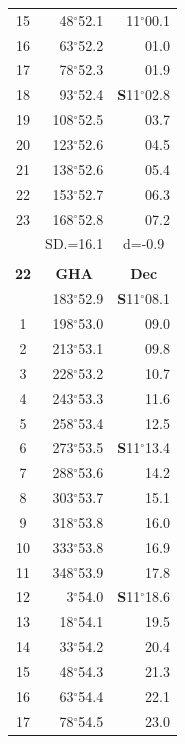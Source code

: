 \documentclass[10pt, a4paper]{report}
\begin{document}
\begin{scriptsize}
\begin{tabular*}{0.2\textwidth}[t]{@{\extracolsep{\fill}}|c|rr|}
15 & 48$^\circ$52.1 & 11$^\circ$00.1\\
16 & 63$^\circ$52.2 & 01.0\\
17 & 78$^\circ$52.3 & 01.9\\[2Pt]
18 & 93$^\circ$52.4 & \textbf{S}11$^\circ$02.8\\
19 & 108$^\circ$52.5 & 03.7\\
20 & 123$^\circ$52.6 & 04.5\\
21 & 138$^\circ$52.6 & \raisebox{0.24ex}{\boldmath$\cdot$~\boldmath$\cdot$~~}05.4\\
22 & 153$^\circ$52.7 & 06.3\\
23 & 168$^\circ$52.8 & 07.2\\
\hline
\rule{0pt}{2.4ex} & \multicolumn{1}{c}{SD.=16.1} & \multicolumn{1}{c|}{d=-0.9}\\
\hline
\multicolumn{1}{c}{}\\[-0.5ex]\hline
\multicolumn{1}{|c|}{\rule{0pt}{2.6ex}\textbf{22}} & \multicolumn{1}{c}{\textbf{GHA}} & \multicolumn{1}{c|}{\textbf{Dec}}\\
\hline\rule{0pt}{2.6ex}\noindent
0 & 183$^\circ$52.9 & \textbf{S}11$^\circ$08.1\\
1 & 198$^\circ$53.0 & 09.0\\
2 & 213$^\circ$53.1 & 09.8\\
3 & 228$^\circ$53.2 & \raisebox{0.24ex}{\boldmath$\cdot$~\boldmath$\cdot$~~}10.7\\
4 & 243$^\circ$53.3 & 11.6\\
5 & 258$^\circ$53.4 & 12.5\\[2Pt]
6 & 273$^\circ$53.5 & \textbf{S}11$^\circ$13.4\\
7 & 288$^\circ$53.6 & 14.2\\
8 & 303$^\circ$53.7 & 15.1\\
9 & 318$^\circ$53.8 & \raisebox{0.24ex}{\boldmath$\cdot$~\boldmath$\cdot$~~}16.0\\
10 & 333$^\circ$53.8 & 16.9\\
11 & 348$^\circ$53.9 & 17.8\\[2Pt]
12 & 3$^\circ$54.0 & \textbf{S}11$^\circ$18.6\\
13 & 18$^\circ$54.1 & 19.5\\
14 & 33$^\circ$54.2 & 20.4\\
15 & 48$^\circ$54.3 & \raisebox{0.24ex}{\boldmath$\cdot$~\boldmath$\cdot$~~}21.3\\
16 & 63$^\circ$54.4 & 22.1\\
17 & 78$^\circ$54.5 & 23.0\\[2Pt]

\end{tabular*}
\end{scriptsize}
\end{document}
